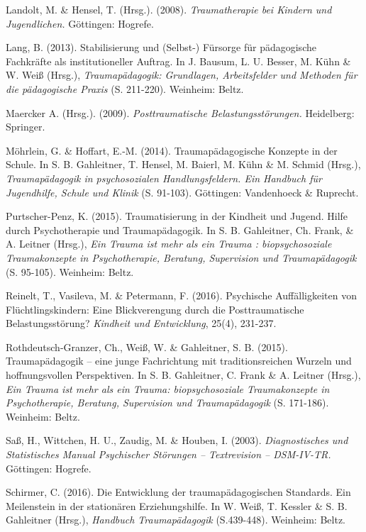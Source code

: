 \hang
Landolt, M. \& Hensel, T. (Hrsg.). (2008). \textit{Traumatherapie bei Kindern und Jugendlichen.} Göttingen: Hogrefe.

\hang
Lang, B. (2013). Stabilisierung und (Selbst-) F{\"u}rsorge f{\"u}r p{\"a}dagogische Fachkr{\"a}fte als institutioneller Auftrag. In J. Bausum, L. U. Besser, M. Kühn \& W. Weiß (Hrsg.), \textit{Traumapädagogik: Grundlagen, Arbeitsfelder und Methoden für die pädagogische Praxis} (S. 211-220). Weinheim: Beltz.

\hang
Maercker A. (Hrsg.). (2009). \textit{Posttraumatische Belastungsst{\"o}rungen.} Heidelberg: Springer.

\hang
M{\"o}hrlein, G. \& Hoffart, E.-M. (2014). Traumap{\"a}dagogische Konzepte in der Schule. In S. B. Gahleitner, T. Hensel, M. Baierl, M. K{\"u}hn \& M. Schmid (Hrsg.), \textit{Traumap{\"a}dagogik in psychosozialen Handlungsfeldern. Ein Handbuch f{\"u}r Jugendhilfe, Schule und Klinik} (S. 91-103). Göttingen: Vandenhoeck \& Ruprecht.

\hang
Purtscher-Penz, K. (2015). Traumatisierung in der Kindheit und Jugend. Hilfe durch Psychotherapie und Traumap{\"a}dagogik. In S. B. Gahleitner, Ch. Frank, \& A. Leitner (Hrsg.), \textit{Ein Trauma ist mehr als ein Trauma : biopsychosoziale Traumakonzepte in Psychotherapie, Beratung, Supervision und Traumap{\"a}dagogik} (S. 95-105). Weinheim: Beltz.

\hang
Reinelt, T., Vasileva, M. \& Petermann, F. (2016). Psychische Auff{\"a}lligkeiten von Fl{\"u}chtlingskindern: Eine Blickverengung durch die Posttraumatische Belastungsst{\"o}rung? \textit{Kindheit und Entwicklung}, 25(4), 231-237.

\hang
Rothdeutsch-Granzer, Ch., Weiß, W. \& Gahleitner, S. B. (2015). Traumap{\"a}dagogik – eine junge Fachrichtung mit traditionsreichen Wurzeln und hoffnungsvollen Perspektiven. In S. B. Gahleitner, C. Frank \& A. Leitner (Hrsg.), \textit{Ein Trauma ist mehr als ein Trauma: biopsychosoziale Traumakonzepte in Psychotherapie, Beratung, Supervision und Traumap{\"a}dagogik} (S. 171-186). Weinheim: Beltz.

\hang
Saß, H., Wittchen, H. U., Zaudig, M. \& Houben, I. (2003). \textit{Diagnostisches und Statistisches Manual Psychischer Störungen – Textrevision – DSM-IV-TR.} Göttingen: Hogrefe.

\hang
Schirmer, C. (2016). Die Entwicklung der traumapädagogischen Standards. Ein Meilenstein in der stationären Erziehungshilfe. In W. Weiß, T. Kessler \& S. B. Gahleitner (Hrsg.), \textit{Handbuch Traumapädagogik} (S.439-448). Weinheim: Beltz.


